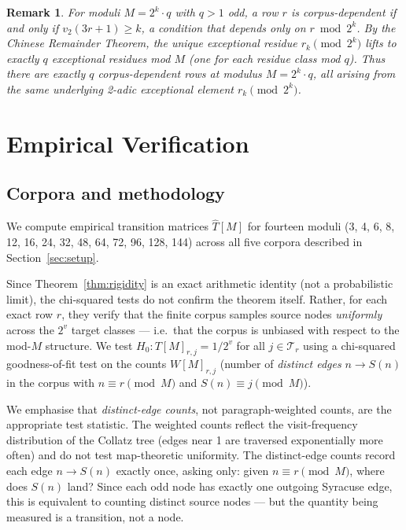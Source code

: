 \documentclass[12pt,a4paper]{article}
\newtheorem{remark}[theorem]{Remark}
\begin{document}
\begin{remark}
For moduli $M = 2^k \cdot q$ with $q > 1$ odd, a row $r$ is corpus-dependent
if and only if $v_2(3r+1) \geq k$, a condition that depends only on $r \bmod
2^k$.  By the Chinese Remainder Theorem, the unique exceptional residue
$r_k \pmod{2^k}$ lifts to exactly $q$ exceptional residues mod $M$ (one for
each residue class mod $q$).  Thus there are exactly $q$ corpus-dependent rows
at modulus $M = 2^k \cdot q$, all arising from the same underlying 2-adic
exceptional element $r_k \pmod{2^k}$.
\end{remark}

\section{Empirical Verification}
\label{sec:empirical}

\subsection{Corpora and methodology}

We compute empirical transition matrices $\hat{T}[M]$ for fourteen moduli
(3, 4, 6, 8, 12, 16, 24, 32, 48, 64, 72, 96, 128, 144) across all five
corpora described in Section~\ref{sec:setup}.

Since Theorem~\ref{thm:rigidity} is an exact arithmetic identity (not a
probabilistic limit), the chi-squared tests do not confirm the theorem itself.
Rather, for each exact row $r$, they verify that the finite corpus samples
source nodes \emph{uniformly} across the $2^v$ target classes — i.e.\ that
the corpus is unbiased with respect to the mod-$M$ structure.  We test
$H_0: T[M]_{r,j} = 1/2^v$ for all $j \in \mathcal{T}_r$ using a chi-squared
goodness-of-fit test on the counts $W[M]_{r,j}$ (number of \emph{distinct edges}
$n \to S(n)$ in the corpus with $n \equiv r \pmod{M}$ and $S(n) \equiv j
\pmod{M}$).

We emphasise that \emph{distinct-edge counts}, not paragraph-weighted counts,
are the appropriate test statistic.  The weighted counts reflect the
visit-frequency distribution of the Collatz tree (edges near 1 are traversed
exponentially more often) and do not test map-theoretic uniformity.  The
distinct-edge counts record each edge $n \to S(n)$ exactly once, asking only:
given $n \equiv r \pmod{M}$, where does $S(n)$ land?  Since each odd node has
exactly one outgoing Syracuse edge, this is equivalent to counting distinct
source nodes — but the quantity being measured is a transition, not a node.
\end{document}
